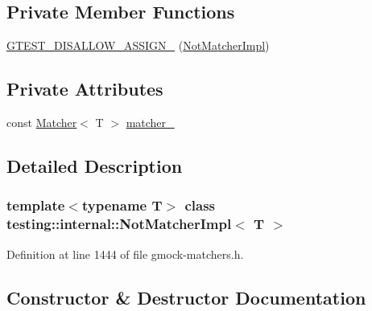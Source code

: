 \subsection*{Private Member Functions}
\begin{DoxyCompactItemize}
\item 
\hyperlink{classtesting_1_1internal_1_1NotMatcherImpl_a9960ad99fa3345626edb650bca78ecc9}{G\+T\+E\+S\+T\+\_\+\+D\+I\+S\+A\+L\+L\+O\+W\+\_\+\+A\+S\+S\+I\+G\+N\+\_\+} (\hyperlink{classtesting_1_1internal_1_1NotMatcherImpl}{Not\+Matcher\+Impl})
\end{DoxyCompactItemize}
\subsection*{Private Attributes}
\begin{DoxyCompactItemize}
\item 
const \hyperlink{classtesting_1_1Matcher}{Matcher}$<$ T $>$ \hyperlink{classtesting_1_1internal_1_1NotMatcherImpl_a913c0244b28d9b9227a8a7353aedb648}{matcher\+\_\+}
\end{DoxyCompactItemize}


\subsection{Detailed Description}
\subsubsection*{template$<$typename T$>$\newline
class testing\+::internal\+::\+Not\+Matcher\+Impl$<$ T $>$}



Definition at line 1444 of file gmock-\/matchers.\+h.



\subsection{Constructor \& Destructor Documentation}
\mbox{\label{classtesting_1_1internal_1_1NotMatcherImpl_aaf35f72ebe8379f09169f4f0845cc663}} 
